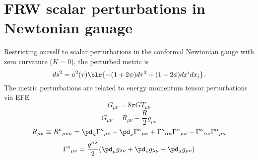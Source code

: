 \documentclass[10pt,letterpaper]{article}
\begin{document}
\section*{FRW scalar perturbations in Newtonian gauage}
Restricting ourself to scalar perturbations in the conformal Newtonian gauge with zero curvature ($K=0$), the perturbed metric is
\[
	ds^2 = a^2(\tau) \blr{ - (1+2\psi)d\tau^2+(1-2\phi)dx^idx_i}.
\]
The metric perturbations are related to energy momentum tensor perturbations via EFE
\[
	G_{\mu\nu} = 8\pi GT_{\mu\nu}
\]
\[
	G_{\mu\nu} = R_{\mu\nu}-\frac{R}{2} g_{\mu\nu}
\]
\[
	R_{\mu\nu} \equiv R^\kappa{}_{\mu\kappa\nu} = \pd_\kappa \Gamma^\kappa{}_{\mu\nu}
	-\pd_\nu \Gamma^{\kappa}{}_{\mu\kappa}+\Gamma^{\kappa}{}_{\alpha\kappa}\Gamma^{\alpha}{}
	_{\mu\nu} - \Gamma^{\kappa}{}_{\alpha\nu}\Gamma^{\alpha}{}_{\mu\kappa}
\]
\[
	\Gamma^{\kappa}{}_{\mu\nu} = \frac{g^{\kappa\lambda}}{2}(\pd_\mu g_{\lambda \nu}
	+ \pd_\nu g_{\lambda \mu} - \pd_{\lambda} g_{\mu\nu})
\]
\end{document}
